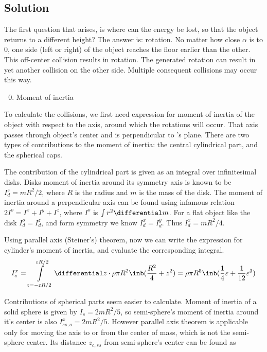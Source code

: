 \subsection*{Solution}

The first question that arises, is where can the energy be lost,
so that the object returns to a different height?
The answer is: rotation.
No matter how close $\alpha$ is to $0$,
one side (left or right) of the object reaches the floor earlier than the other.
This off-center collision results in rotation.
The generated rotation can result in yet another collision on the other side.
Multiple consequent collisions may occur this way.

{\bfseries
\begin{enumerate}
    \setcounter{enumi}{-1}
    \item Moment of inertia
\end{enumerate}
}

To calculate the collisions, we first need expression for
moment of inertia of the object with respect to the axis,
around which the rotations will occur.
That axis passes through object's center and is perpendicular to 's plane.
There are two types of contributions to the moment of inertia:
the central cylindrical part, and the spherical caps.

The contribution of the cylindrical part is given as an integral over
infinitesimal disks. Disks moment of inertia around its symmetry axis
is known to be $I_d^z=mR^2/2$, where $R$ is the radius and
$m$ is the mass of the disk.
The moment of inertia around a perpendicular axis can be found using
infamous relation $2I^o = I^x + I^y + I^z$,
where $I^o$ is $\int r^2 \differential m$.
For a flat object like the disk $I_d^o = I_d^z$,
and form symmetry we know $I_d^x = I_d^y$. Thus $I_d^x=mR^2/4$.

Using parallel axis (Steiner's) theorem, now we can write the expression
for cylinder's moment of inertia, and evaluate the corresponding integral.
\begin{equation}
    I_c^x = \int\limits_{z=-\varepsilon R/2}^{\varepsilon R/2}
        \differential z \cdot \rho \pi R^2 \inb({\frac{R^2}{4} + z^2})=
        \rho \pi R^5 \inb({\frac{1}{4}\varepsilon+\frac{1}{12}\varepsilon^3})
\end{equation}

Contributions of spherical parts seem easier to calculate.
Moment of inertia of a solid sphere is given by $I_s = 2mR^2/5$,
so semi-sphere's moment of inertia around it's center is also
$I_{ss,o}^x=2mR^2/5$. However parallel axis theorem is applicable only for
moving the axis to or from the center of mass, which is not the semi-sphere center.
Its distance $z_{c,ss}$ from semi-sphere's center can be found as

